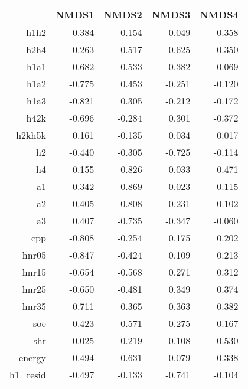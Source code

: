 \begin{table}[ht]
\centering
\begin{tabular}{rrrrr}
  \hline
 & NMDS1 & NMDS2 & NMDS3 & NMDS4 \\ 
  \hline
h1h2 & -0.384 & -0.154 & 0.049 & -0.358 \\ 
  h2h4 & -0.263 & 0.517 & -0.625 & 0.350 \\ 
  h1a1 & -0.682 & 0.533 & -0.382 & -0.069 \\ 
  h1a2 & -0.775 & 0.453 & -0.251 & -0.120 \\ 
  h1a3 & -0.821 & 0.305 & -0.212 & -0.172 \\ 
  h42k & -0.696 & -0.284 & 0.301 & -0.372 \\ 
  h2kh5k & 0.161 & -0.135 & 0.034 & 0.017 \\ 
  h2 & -0.440 & -0.305 & -0.725 & -0.114 \\ 
  h4 & -0.155 & -0.826 & -0.033 & -0.471 \\ 
  a1 & 0.342 & -0.869 & -0.023 & -0.115 \\ 
  a2 & 0.405 & -0.808 & -0.231 & -0.102 \\ 
  a3 & 0.407 & -0.735 & -0.347 & -0.060 \\ 
  cpp & -0.808 & -0.254 & 0.175 & 0.202 \\ 
  hnr05 & -0.847 & -0.424 & 0.109 & 0.213 \\ 
  hnr15 & -0.654 & -0.568 & 0.271 & 0.312 \\ 
  hnr25 & -0.650 & -0.481 & 0.349 & 0.374 \\ 
  hnr35 & -0.711 & -0.365 & 0.363 & 0.382 \\ 
  soe & -0.423 & -0.571 & -0.275 & -0.167 \\ 
  shr & 0.025 & -0.219 & 0.108 & 0.530 \\ 
  energy & -0.494 & -0.631 & -0.079 & -0.338 \\ 
  h1\_resid & -0.497 & -0.133 & -0.741 & -0.104 \\ 
   \hline
\end{tabular}
\end{table}
